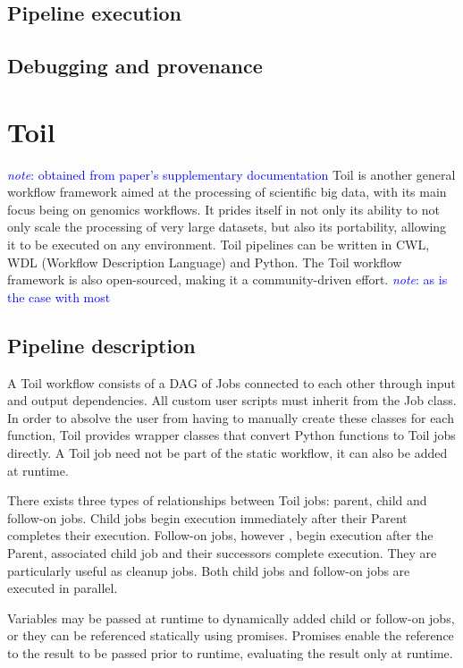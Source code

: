 \documentclass{report}
\newcommand{\note}[1]{\textcolor{blue}{\textit{note}: #1}}
\begin{document}
        \subsection{Pipeline execution} 
        \subsection{Debugging and provenance} 
    \section{Toil}
        \note{obtained from paper's supplementary documentation}
        Toil is another general workflow framework aimed at the processing of 
        scientific big data, with its main focus being on genomics workflows. It 
        prides itself in not only its ability to not only scale the processing 
        of very large datasets, but also its portability, allowing it to be 
        executed on any environment. Toil pipelines can be written in CWL, WDL 
        (Workflow Description Language) and Python. The Toil workflow 
        framework is also open-sourced, making it a community-driven effort. 
        \note{as is the case with most} 

        \subsection{Pipeline description}
           A Toil workflow consists of a DAG of Jobs connected to each other
           through input and output dependencies. All custom user scripts must
           inherit from the Job class. In order to absolve the user from having
           to manually create these classes for each function, Toil provides
           wrapper classes that convert Python functions to Toil jobs directly.
           A Toil job need not be part of the static workflow, it can also be
           added at runtime.

           There exists three types of relationships between Toil jobs: parent, 
           child and follow-on jobs. Child jobs begin execution immediately
           after their Parent completes their execution. Follow-on jobs, however
           , begin execution after the Parent, associated child job and their
           successors complete execution. They are particularly useful as 
           cleanup jobs. Both child jobs and follow-on jobs are executed in
           parallel.

           Variables may be passed at runtime to dynamically added child or
           follow-on jobs, or they can be referenced statically using promises.
           Promises enable the reference to the result to be passed prior to 
           runtime, evaluating the result only at runtime.
\end{document}
